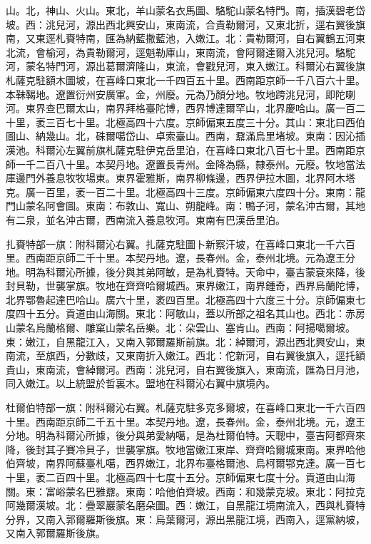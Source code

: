 \begin{pinyinscope}
山。北，神山、火山。東北，羊山蒙名衣馬圖、駱駝山蒙名特門。南，插漢碧老岱坡。西：洮兒河，源出西北興安山，東南流，合貴勒爾河，又東北折，逕右翼後旗南，又東逕札賚特南，匯為納藍撒藍池，入嫩江。北：貴勒爾河，自右翼鶴五河東北流，會榆河，為貴勒爾河，逕魁勒庫山，東南流，會阿爾達爾入洮兒河。駱駝河，蒙名特門河，源出葛爾濟隆山，東流，會戳兒河，東入嫩江。科爾沁右翼後旗札薩克駐額木圖坡，在喜峰口東北一千四百五十里。西南距京師一千八百六十里。本靺鞨地。遼置衍州安廣軍。金，州廢。元為乃顏分地。牧地跨洮兒河，即陀喇河。東界查巴爾太山，南界拜格臺陀博，西界博達爾罕山，北界慶哈山。廣一百二十里，袤三百七十里。北極高四十六度。京師偏東五度三十分。其山：東北曰西伯圖山、納幾山。北，硃爾噶岱山、卓索臺山。西南，鼐滿烏里堵坡。東南：因沁插漢池。科爾沁左翼前旗札薩克駐伊克岳里泊，在喜峰口東北八百七十里。西南距京師一千二百八十里。本契丹地。遼置長青州。金降為縣，隸泰州。元廢。牧地當法庫邊門外養息牧牧場東。東界霍雅斯，南界柳條邊，西界伊拉木圖，北界阿木塔克。廣一百里，袤一百二十里。北極高四十三度。京師偏東六度四十分。東南：龍門山蒙名阿會圖。東南：布敦山、寬山、朔龍峰。南：鴨子河，蒙名沖古爾，其地有二泉，並名沖古爾，西南流入養息牧河。東南有巴漢岳里泊。

扎賚特部一旗：附科爾沁右翼。扎薩克駐圖卜新察汗坡，在喜峰口東北一千六百里。西南距京師二千十里。本契丹地。遼，長春州。金，泰州北境。元為遼王分地。明為科爾沁所據，後分與其弟阿敏，是為札賚特。天命中，臺吉蒙袞來降，後封貝勒，世襲掌旗。牧地在齊齊哈爾城西。東界嫩江，南界鍾奇，西界烏蘭陀博，北界鄂魯起達巴哈山。廣六十里，袤四百里。北極高四十六度三十分。京師偏東七度四十五分。貢道由山海關。東北：阿敏山，蓋以所部之祖名其山也。西北：赤房山蒙名烏蘭格爾、雕窠山蒙名岳樂。北：朵雲山、塞肯山。西南：阿揚噶爾坡。東：嫩江，自黑龍江入，又南入郭爾羅斯前旗。北：綽爾河，源出西北興安山，東南流，至旗西，分數歧，又東南折入嫩江。西北：佗新河，自右翼後旗入，逕托額貴山，東南流，會綽爾河。西南：洮兒河，自右翼後旗入，東南流，匯為日月池，同入嫩江。以上統盟於哲裏木。盟地在科爾沁右翼中旗境內。

杜爾伯特部一旗：附科爾沁右翼。札薩克駐多克多爾坡，在喜峰口東北一千六百四十里。西南距京師二千五十里。本契丹地。遼，長春州。金，泰州北境。元，遼王分地。明為科爾沁所據，後分與弟愛納噶，是為杜爾伯特。天聰中，臺吉阿都齊來降，後封其子賽冷貝子，世襲掌旗。牧地當嫩江東岸、齊齊哈爾城東南。東界哈他伯齊坡，南界阿蘇臺札噶，西界嫩江，北界布臺格爾池、烏柯爾鄂克達。廣一百七十里，袤二百四十里。北極高四十七度十五分。京師偏東七度十分。貢道由山海關。東：富峪蒙名巴雅鼐。東南：哈他伯齊坡。西南：和幾蒙克坡。東北：阿拉克阿幾爾漢坡。北：疊翠巖蒙名磨朵圖。西：嫩江，自黑龍江境南流入，西與札賚特分界，又南入郭爾羅斯後旗。東：烏葉爾河，源出黑龍江境，西南入，逕黨納坡，又南入郭爾羅斯後旗。


\end{pinyinscope}

